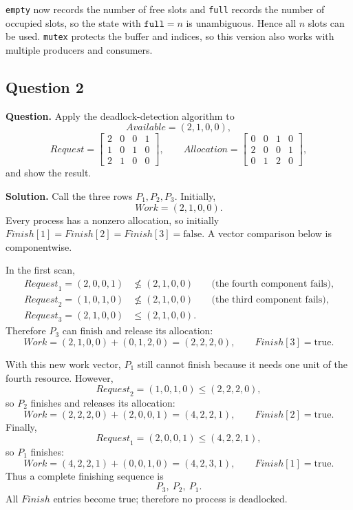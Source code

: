\texttt{empty} now records the number of free slots and \texttt{full}
records the number of occupied slots, so the state with
\(\texttt{full}=n\) is unambiguous.  Hence all \(n\) slots can be used.
\texttt{mutex} protects the buffer and indices, so this version also
works with multiple producers and consumers.

\subsection*{Question 2}
\textbf{Question.}
Apply the deadlock-detection algorithm to
\[
 \mathit{Available}=(2,1,0,0),
\]
\[
 \mathit{Request}=
 \begin{bmatrix}
 2&0&0&1\\
 1&0&1&0\\
 2&1&0&0
 \end{bmatrix},
 \qquad
 \mathit{Allocation}=
 \begin{bmatrix}
 0&0&1&0\\
 2&0&0&1\\
 0&1&2&0
 \end{bmatrix},
\]
and show the result.

\textbf{Solution.}
Call the three rows \(P_1,P_2,P_3\).  Initially,
\[
 \mathit{Work}=(2,1,0,0).
\]
Every process has a nonzero allocation, so initially
\(\mathit{Finish}[1]=\mathit{Finish}[2]=\mathit{Finish}[3]=\mathrm{false}\).
A vector comparison below is componentwise.

In the first scan,
\[
\begin{aligned}
 \mathit{Request}_1=(2,0,0,1)&\nleq(2,1,0,0)
       &&\text{(the fourth component fails)},\\
 \mathit{Request}_2=(1,0,1,0)&\nleq(2,1,0,0)
       &&\text{(the third component fails)},\\
 \mathit{Request}_3=(2,1,0,0)&\leq(2,1,0,0).
\end{aligned}
\]
Therefore \(P_3\) can finish and release its allocation:
\[
 \mathit{Work}
 =(2,1,0,0)+(0,1,2,0)
 =(2,2,2,0),
 \qquad \mathit{Finish}[3]=\mathrm{true}.
\]

With this new work vector, \(P_1\) still cannot finish because it needs
one unit of the fourth resource.  However,
\[
 \mathit{Request}_2=(1,0,1,0)\leq(2,2,2,0),
\]
so \(P_2\) finishes and releases its allocation:
\[
 \mathit{Work}
 =(2,2,2,0)+(2,0,0,1)
 =(4,2,2,1),
 \qquad \mathit{Finish}[2]=\mathrm{true}.
\]
Finally,
\[
 \mathit{Request}_1=(2,0,0,1)\leq(4,2,2,1),
\]
so \(P_1\) finishes:
\[
 \mathit{Work}
 =(4,2,2,1)+(0,0,1,0)
 =(4,2,3,1),
 \qquad \mathit{Finish}[1]=\mathrm{true}.
\]
Thus a complete finishing sequence is
\[
 \boxed{P_3,\ P_2,\ P_1}.
\]
All \(\mathit{Finish}\) entries become true; therefore no process is
deadlocked.

